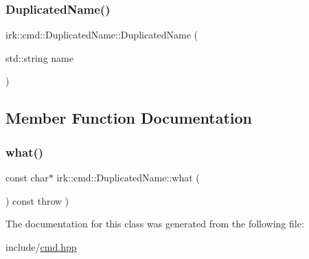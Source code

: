 \subsubsection{\texorpdfstring{Duplicated\+Name()}{DuplicatedName()}}
{\footnotesize\ttfamily irk\+::cmd\+::\+Duplicated\+Name\+::\+Duplicated\+Name (\begin{DoxyParamCaption}\item[{std\+::string}]{name }\end{DoxyParamCaption})\hspace{0.3cm}{\ttfamily [inline]}}



\subsection{Member Function Documentation}
\mbox{\label{classirk_1_1cmd_1_1DuplicatedName_a0c780a6365c501318eb970ad9fe2b679}} 
\subsubsection{\texorpdfstring{what()}{what()}}
{\footnotesize\ttfamily const char$\ast$ irk\+::cmd\+::\+Duplicated\+Name\+::what (\begin{DoxyParamCaption}{ }\end{DoxyParamCaption}) const throw  ) \hspace{0.3cm}{\ttfamily [inline]}}



The documentation for this class was generated from the following file\+:\begin{DoxyCompactItemize}
\item 
include/\mbox{\hyperlink{cmd_8hpp}{cmd.\+hpp}}\end{DoxyCompactItemize}
